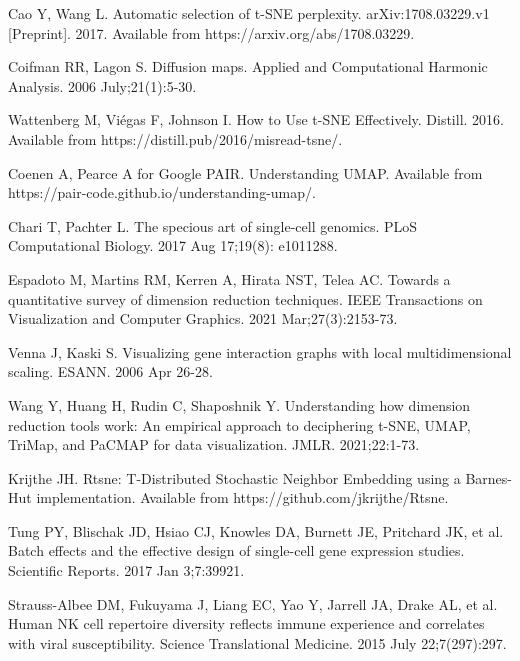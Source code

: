 \documentclass{article}
\begin{document}
\begin{thebibliography}{10}
Cao Y, Wang L. 
\newblock Automatic selection of t-SNE perplexity.
\newblock arXiv:1708.03229.v1 [Preprint]. 2017. Available from https://arxiv.org/abs/1708.03229.

Coifman RR, Lagon S.
\newblock Diffusion maps.
\newblock Applied and Computational Harmonic Analysis. 2006 July;21(1):5-30.

Wattenberg M, Vi\'egas F, Johnson I.
\newblock How to Use t-SNE Effectively.
\newblock Distill. 2016. Available from https://distill.pub/2016/misread-tsne/.

Coenen A, Pearce A for Google PAIR.
\newblock Understanding UMAP.
\newblock Available from https://pair-code.github.io/understanding-umap/.

Chari T, Pachter L.
\newblock The specious art of single-cell genomics.
\newblock PLoS Computational Biology. 2017 Aug 17;19(8): e1011288.

Espadoto M, Martins RM, Kerren A, Hirata NST, Telea AC.
\newblock Towards a quantitative survey of dimension reduction techniques.
\newblock  IEEE Transactions on Visualization and Computer Graphics. 2021 Mar;27(3):2153-73.

Venna J, Kaski S.
\newblock Visualizing gene interaction graphs with local multidimensional scaling.
\newblock ESANN. 2006 Apr 26-28.

Wang Y, Huang H, Rudin C, Shaposhnik Y.
\newblock Understanding how dimension reduction tools work: An empirical approach to deciphering t-SNE, UMAP, TriMap, and PaCMAP for data visualization.
\newblock JMLR. 2021;22:1-73.

Krijthe JH.
\newblock Rtsne: T-Distributed Stochastic Neighbor Embedding using a Barnes-Hut implementation.
\newblock Available from https://github.com/jkrijthe/Rtsne.

Tung PY, Blischak JD, Hsiao CJ, Knowles DA, Burnett JE, Pritchard JK, et al.
\newblock Batch effects and the effective design of single-cell gene expression studies.
\newblock Scientific Reports. 2017 Jan 3;7:39921.

Strauss-Albee DM, Fukuyama J, Liang EC, Yao Y, Jarrell JA, Drake AL, et al.
\newblock Human NK cell repertoire diversity reflects immune experience and correlates with viral susceptibility.
\newblock Science Translational Medicine. 2015 July 22;7(297):297.


\end{thebibliography}
\end{document}

